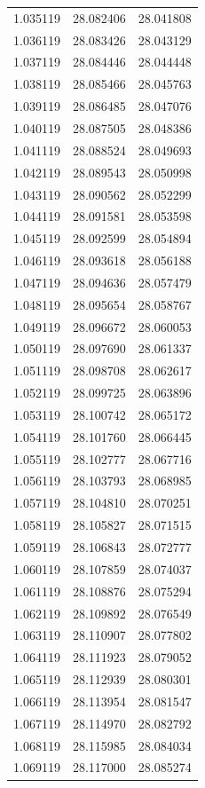 \begin{tabular}{rrr}
1.035119 & 28.082406 & 28.041808 \\
1.036119 & 28.083426 & 28.043129 \\
1.037119 & 28.084446 & 28.044448 \\
1.038119 & 28.085466 & 28.045763 \\
1.039119 & 28.086485 & 28.047076 \\
1.040119 & 28.087505 & 28.048386 \\
1.041119 & 28.088524 & 28.049693 \\
1.042119 & 28.089543 & 28.050998 \\
1.043119 & 28.090562 & 28.052299 \\
1.044119 & 28.091581 & 28.053598 \\
1.045119 & 28.092599 & 28.054894 \\
1.046119 & 28.093618 & 28.056188 \\
1.047119 & 28.094636 & 28.057479 \\
1.048119 & 28.095654 & 28.058767 \\
1.049119 & 28.096672 & 28.060053 \\
1.050119 & 28.097690 & 28.061337 \\
1.051119 & 28.098708 & 28.062617 \\
1.052119 & 28.099725 & 28.063896 \\
1.053119 & 28.100742 & 28.065172 \\
1.054119 & 28.101760 & 28.066445 \\
1.055119 & 28.102777 & 28.067716 \\
1.056119 & 28.103793 & 28.068985 \\
1.057119 & 28.104810 & 28.070251 \\
1.058119 & 28.105827 & 28.071515 \\
1.059119 & 28.106843 & 28.072777 \\
1.060119 & 28.107859 & 28.074037 \\
1.061119 & 28.108876 & 28.075294 \\
1.062119 & 28.109892 & 28.076549 \\
1.063119 & 28.110907 & 28.077802 \\
1.064119 & 28.111923 & 28.079052 \\
1.065119 & 28.112939 & 28.080301 \\
1.066119 & 28.113954 & 28.081547 \\
1.067119 & 28.114970 & 28.082792 \\
1.068119 & 28.115985 & 28.084034 \\
1.069119 & 28.117000 & 28.085274 \\

\end{tabular}
